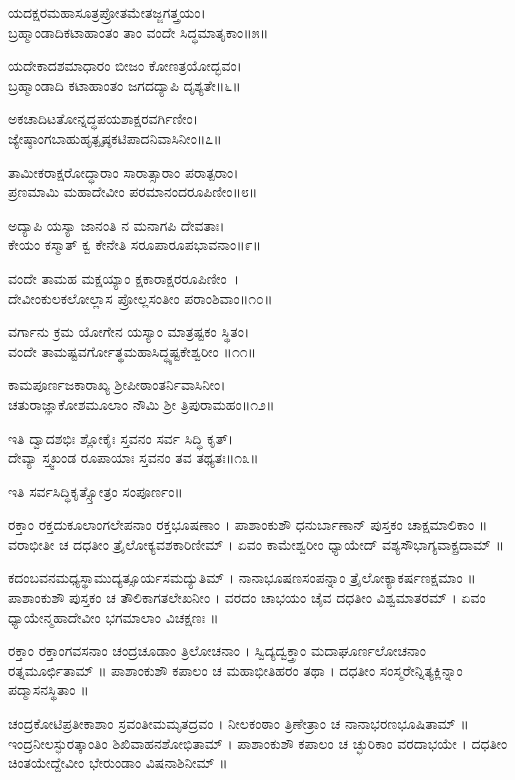 ಯದಕ್ಷರಮಹಾಸೂತ್ರಪ್ರೋತಮೇತಜ್ಜಗತ್ತ್ರಯಂ।\\
ಬ್ರಹ್ಮಾಂಡಾದಿಕಟಾಹಾಂತಂ ತಾಂ ವಂದೇ ಸಿದ್ಧಮಾತೃಕಾಂ॥೫॥

ಯದೇಕಾದಶಮಾಧಾರಂ ಬೀಜಂ ಕೋಣತ್ರಯೋದ್ಭವಂ।\\
ಬ್ರಹ್ಮಾಂಡಾದಿ ಕಟಾಹಾಂತಂ ಜಗದದ್ಯಾಪಿ ದೃಶ್ಯತೇ॥೬॥

ಅಕಚಾದಿಟತೋನ್ನದ್ಧಪಯಶಾಕ್ಷರವರ್ಗಿಣೀಂ।\\
ಜ್ಯೇಷ್ಠಾಂಗಬಾಹುಹೃತ್ಪೃಷ್ಠಕಟಿಪಾದನಿವಾಸಿನೀಂ॥೭॥

ತಾಮೀಕರಾಕ್ಷರೋದ್ಧಾರಾಂ ಸಾರಾತ್ಸಾರಾಂ ಪರಾತ್ಪರಾಂ।\\
ಪ್ರಣಮಾಮಿ ಮಹಾದೇವೀಂ ಪರಮಾನಂದರೂಪಿಣೀಂ॥೮॥

ಅದ್ಯಾಪಿ ಯಸ್ಯಾ ಜಾನಂತಿ ನ ಮನಾಗಪಿ ದೇವತಾಃ।\\
ಕೇಯಂ ಕಸ್ಮಾತ್ ಕ್ವ ಕೇನೇತಿ ಸರೂಪಾರೂಪಭಾವನಾಂ॥೯॥

ವಂದೇ ತಾಮಹ ಮಕ್ಷಯ್ಯಾಂ ಕ್ಷಕಾರಾಕ್ಷರರೂಪಿಣೀಂ~।\\
ದೇವೀಂಕುಲಕಲೋಲ್ಲಾಸ ಪ್ರೋಲ್ಲಸಂತೀಂ ಪರಾಂಶಿವಾಂ॥೧೦॥

ವರ್ಗಾನು ಕ್ರಮ ಯೋಗೇನ ಯಸ್ಯಾಂ ಮಾತ್ರಷ್ಟಕಂ ಸ್ಥಿತಂ।\\
ವಂದೇ ತಾಮಷ್ಟವರ್ಗೋತ್ಥಮಹಾಸಿದ್ಧ್ಯಷ್ಟಕೇಶ್ವರೀಂ ॥೧೧॥

ಕಾಮಪೂರ್ಣಜಕಾರಾಖ್ಯ ಶ್ರೀಪೀಠಾಂತರ್ನಿವಾಸಿನೀಂ।\\
ಚತುರಾಜ್ಞಾಕೋಶಮೂಲಾಂ ನೌಮಿ ಶ್ರೀ ತ್ರಿಪುರಾಮಹಂ॥೧೨॥

ಇತಿ ದ್ವಾದಶಭಿಃ ಶ್ಲೋಕೈಃ ಸ್ತವನಂ ಸರ್ವ ಸಿದ್ಧಿ ಕೃತ್।\\
ದೇವ್ಯಾ ಸ್ತ್ವಖಂಡ ರೂಪಾಯಾಃ ಸ್ತವನಂ ತವ ತಥ್ಯತಃ॥೧೩॥
\begin{center}{\Large ಇತಿ ಸರ್ವಸಿದ್ಧಿಕೃತ್ಸ್ತೋತ್ರಂ ಸಂಪೂರ್ಣಂ॥}\end{center}
ರಕ್ತಾಂ ರಕ್ತದುಕೂಲಾಂಗಲೇಪನಾಂ ರಕ್ತಭೂಷಣಾಂ ।
ಪಾಶಾಂಕುಶೌ ಧನುರ್ಬಾಣಾನ್ ಪುಸ್ತಕಂ ಚಾಕ್ಷಮಾಲಿಕಾಂ ॥
ವರಾಭೀತೀ ಚ ದಧತೀಂ ತ್ರೈಲೋಕ್ಯವಶಕಾರಿಣೀಮ್ ।
ಏವಂ ಕಾಮೇಶ್ವರೀಂ ಧ್ಯಾಯೇದ್ ವಶ್ಯಸೌಭಾಗ್ಯವಾಕ್ಪ್ರದಾಮ್ ॥

ಕದಂಬವನಮಧ್ಯಸ್ಥಾಮುದ್ಯತ್ಸೂರ್ಯಸಮದ್ಯುತಿಮ್ ।
ನಾನಾಭೂಷಣಸಂಪನ್ನಾಂ ತ್ರೈಲೋಕ್ಯಾಕರ್ಷಣಕ್ಷಮಾಂ ॥
ಪಾಶಾಂಕುಶೌ ಪುಸ್ತಕಂ ಚ ತೌಲಿಕಾಗತಲೇಖನೀಂ ।
ವರದಂ ಚಾಭಯಂ ಚೈವ ದಧತೀಂ ವಿಶ್ವಮಾತರಮ್ ।
ಏವಂ ಧ್ಯಾಯೇನ್ಮಹಾದೇವೀಂ ಭಗಮಾಲಾಂ ವಿಚಕ್ಷಣಃ ॥

ರಕ್ತಾಂ ರಕ್ತಾಂಗವಸನಾಂ ಚಂದ್ರಚೂಡಾಂ ತ್ರಿಲೋಚನಾಂ ।
ಸ್ವಿದ್ಯದ್ವಕ್ತ್ರಾಂ ಮದಾಘೂರ್ಣಲೋಚನಾಂ ರತ್ನಮೂರ್ಛಿತಾಮ್ ॥
ಪಾಶಾಂಕುಶೌ ಕಪಾಲಂ ಚ ಮಹಾಭೀತಿಹರಂ ತಥಾ ।
ದಧತೀಂ ಸಂಸ್ಮರೇನ್ನಿತ್ಯಕ್ಲಿನ್ನಾಂ ಪದ್ಮಾಸನಸ್ಥಿತಾಂ ॥

ಚಂದ್ರಕೋಟಿಪ್ರತೀಕಾಶಾಂ ಸ್ರವಂತೀಮಮೃತದ್ರವಂ ।
ನೀಲಕಂಠಾಂ ತ್ರಿಣೇತ್ರಾಂ ಚ ನಾನಾಭರಣಭೂಷಿತಾಮ್ ॥
ಇಂದ್ರನೀಲಸ್ಫುರತ್ಕಾಂತಿಂ ಶಿಖಿವಾಹನಶೋಭಿತಾಮ್ ।
ಪಾಶಾಂಕುಶೌ ಕಪಾಲಂ ಚ ಚ್ಛುರಿಕಾಂ ವರದಾಭಯೇ ।
ದಧತೀಂ ಚಿಂತಯೇದ್ದೇವೀಂ ಭೇರುಂಡಾಂ ವಿಷನಾಶಿನೀಮ್ ॥

